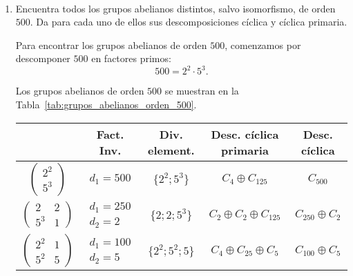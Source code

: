 \begin{ejercicio}\label{ej:7.10}~
    \begin{enumerate}
        \item Encuentra todos los grupos abelianos distintos, salvo isomorfismo, de orden $500$. Da para cada uno de ellos sus descomposiciones cíclica y cíclica primaria.
        
        Para encontrar los grupos abelianos de orden $500$, comenzamos por descomponer $500$ en factores primos:
        \begin{equation*}
            500 = 2^2 \cdot 5^3.
        \end{equation*}

        Los grupos abelianos de orden $500$ se muestran en la Tabla~\ref{tab:grupos_abelianos_orden_500}.
        \begin{table}[h]
            \centering
            \begin{tabular}{c|c|c|c|c}
                & \textbf{Fact. Inv.} & \textbf{Div. element.} & \textbf{Desc. cíclica primaria} & \textbf{Desc. cíclica} \\
                \hline
                $\begin{pmatrix}
                    2^2\\
                    5^3
                \end{pmatrix}
                $ & $d_1=500$ & $\{2^2; 5^3\}$ & $C_4 \oplus C_{125}$ & $C_{500}$ \\ \hline
                $\begin{pmatrix}
                    2 & 2\\
                    5^3 & 1
                \end{pmatrix}
                $ & $\begin{array}{c}
                    d_1=250\\
                    d_2=2
                \end{array}$ & $\{2; 2; 5^3\}$ & $C_2 \oplus C_2 \oplus C_{125}$ & $C_{250} \oplus C_2$ \\ \hline
                $\begin{pmatrix}
                    2^2 & 1\\
                    5^2 & 5
                \end{pmatrix}
                $ & $\begin{array}{c}
                    d_1=100\\
                    d_2=5
                \end{array}$ & $\{2^2; 5^2; 5\}$ & $C_4 \oplus C_{25} \oplus C_5$ & $C_{100} \oplus C_5$ \\ \hline

\end{tabular}
\end{table}
\end{enumerate}
\end{ejercicio}
